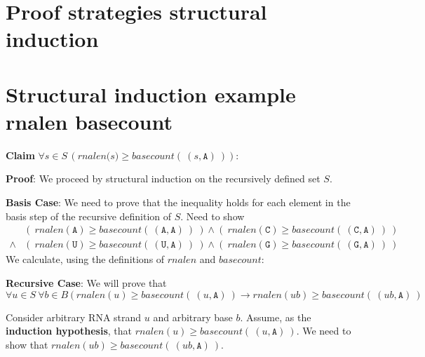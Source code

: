 \documentclass[12pt, oneside]{article}
\newcommand{\A}[0]{\texttt{A}}
\newcommand{\C}[0]{\texttt{C}}
\newcommand{\G}[0]{\texttt{G}}
\newcommand{\U}[0]{\texttt{U}}
\begin{document}
\section*{Proof strategies structural induction}


     \vfill
\section*{Structural induction example rnalen basecount}


{\bf Claim} $\forall s \in S \, (\textit{rnalen(s)} \geq \textit{basecount}(~(s, \A)~))$:

{\bf Proof}: We proceed by structural induction on the recursively defined set $S$.

{\bf Basis  Case}: We need to prove that 
the inequality holds for each element in the basis step of the recursive
definition of $S$. 
Need to show 
\begin{align*}
          &(~ rnalen(\A) \geq basecount(~(\A, \A)~)~) \land (~ rnalen(\C) \geq basecount(~(\C, \A)~)~) \\
    \land & (~ rnalen(\U) \geq basecount(~(\U, \A)~)~) \land (~ rnalen(\G) \geq basecount(~(\G, \A)~)~)
\end{align*}
We calculate, using the definitions of $rnalen$ and $basecount$:

\vspace{100pt}

{\bf Recursive Case}: We will prove that 
\[
    \forall u \in S ~\forall b \in B ~( ~rnalen(u) \geq basecount(~(u, \A)~) \to 
    rnalen(ub) \geq basecount(~(ub, \A)~)
\]

Consider arbitrary RNA strand $u$ and arbitrary base $b$. Assume, as the {\bf induction hypothesis},
that $rnalen(u) \geq basecount(~(u,\A)~)$. We need to show that $rnalen(ub) \geq basecount(~(ub, \A)~)$.
\end{document}
